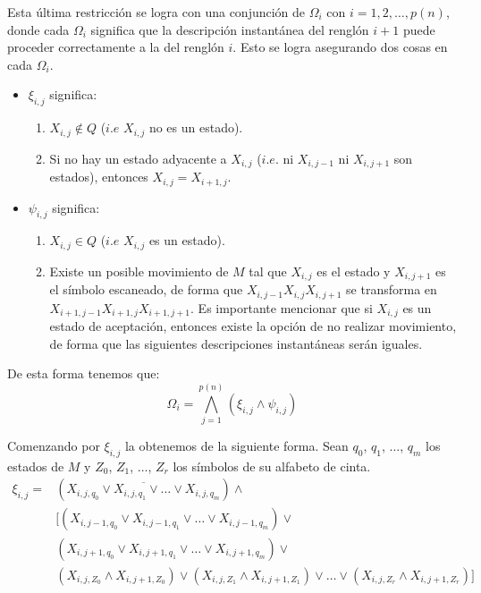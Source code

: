 \documentclass[a4paper]{article}
\begin{document}
Esta última restricción se logra con una conjunción de $\Omega_i$ con $i = 1,2,\dots,p(n)$, donde cada $\Omega_i$ significa que la descripción instantánea del renglón $i+1$ puede proceder correctamente a la del renglón $i$. Esto se logra asegurando dos cosas en cada $\Omega_i$.

\begin{itemize}
  \item $\xi_{i,j}$ significa:
  \begin{enumerate}
    \item $X_{i,j} \not \in Q$ ($i.e$ $X_{i,j}$ no es un estado).
    \item Si no hay un estado adyacente a $X_{i,j}$ ($i.e.$ ni $X_{i,j-1}$ ni $X_{i,j+1}$ son estados), entonces $X_{i,j}=X_{i+1,j}$.
  \end{enumerate}
  \item $\psi_{i,j}$ significa:
  \begin{enumerate}
    \item $X_{i,j} \in Q$ ($i.e$ $X_{i,j}$ es un estado).
    \item Existe un posible movimiento de $M$ tal que $X_{i,j}$ es el estado y $X_{i,j+1}$ es el símbolo escaneado, de forma que $X_{i,j-1} X_{i,j} X_{i,j+1}$ se transforma en $X_{i+1,j-1} X_{i+1,j} X_{i+1,j+1}$. Es importante mencionar que si $X_{i,j}$ es un estado de aceptación, entonces existe la opción de no realizar movimiento, de forma que las siguientes descripciones instantáneas serán iguales.
  \end{enumerate}
\end{itemize}

De esta forma tenemos que:
$$\Omega_i = \bigwedge_{j=1}^{p(n)}\left(\xi_{i,j}\land\psi_{i,j}\right)$$

Comenzando por $\xi_{i,j}$ la obtenemos de la siguiente forma.
Sean $q_0$, $q_1$, $\dots$, $q_m$ los estados de $M$ y $Z_0$, $Z_1$, $\dots$, $Z_r$ los símbolos de su alfabeto de cinta.
\begin{align*}
  \xi_{i,j}=
  &(\overline{X_{i,j,q_0} \lor X_{i,j,q_1} \lor\dots\lor X_{i,j,q_m}}) \land\\
  &[(X_{i,j-1,q_0} \lor X_{i,j-1,q_1} \lor\dots\lor X_{i,j-1,q_m}) \lor\\
  &(X_{i,j+1,q_0} \lor X_{i,j+1,q_1} \lor\dots\lor X_{i,j+1,q_m}) \lor\\
  &(X_{i,j,Z_0}\land X_{i,j+1,Z_0})\lor(X_{i,j,Z_1}\land X_{i,j+1,Z_1})\lor\dots\lor
  (X_{i,j,Z_r}\land X_{i,j+1,Z_r})]
\end{align*}
\end{document}

